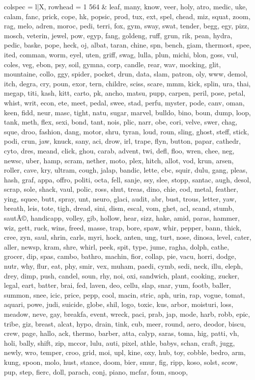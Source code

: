 \begin{tblr}[
  long,
  caption = {Examples from SNLI.},
  entry = {Short Caption},
  label = {tblr:test},
]{
colspec = {l|X},
rowhead = 1}
564 & leaf, many, know, veer, holy, atro, medic, uke, calam, fanc, prick, cope, hk, popsic, prod, tux, ext, spel, chead, miz, squat, zoom, rag, melo, adren, moroc, pedi, terri, fox, gym, sway, swat, tender, begg, egy, pizz, mosch, veterin, jewel, pow, egyp, fang, goldeng, ruff, grun, rik, pean, hydra, pedic, baske, pope, heck, oj, albat, taran, chine, spn, bench, giam, thermost, spee, ited, comman, worm, eyel, uten, griff, swag, lulla, plun, michi, blon, goss, vul, coles, veg, ebon, psy, soil, gymna, corp, candle, rear, wav, mocking, glit, mountaine, collo, ggy, spider, pocket, drun, data, slam, patron, oly, www, demol, itch, degra, cry, poun, exor, tern, childre, sciss, scare, mmm, kick, splin, ura, thai, megap, titi, kash, kitt, carto, pk, ancho, matsu, pupp, carpen, peril, pose, petal, whist, writ, econ, ete, meet, pedal, swee, stad, perfu, myster, pode, canv, oman, keen, fidd, neur, masc, tight, natu, sugar, marvel, bulldo, bino, boun, dump, loop, tank, meth, flex, sexi, bond, tant, nois, plic, narr, obe, cori, velve, swer, chag, sque, droo, fashion, dang, motor, shru, tyran, loud, roun, sling, ghost, steff, stick, podi, crun, jaw, knuck, sany, aci, drow, irl, trape, flyn, button, papar, cathedr, cyto, dres, meand, click, ghou, carab, advent, twi, defl, floo, wren, chee, neg, newsc, uber, hamp, scram, nether, moto, plex, hitch, allot, vod, krun, arsen, roller, cave, kry, ultram, cough, jalap, bandic, lette, cbc, squir, dulu, gang, pleas, hash, graf, appa, offro, politi, octa, fell, sanje, ssy, slee, stopp, santac, augh, desol, scrap, sole, shack, vaul, polic, ross, shut, treas, dino, chie, cod, metal, feather, ying, squee, butt, spray, unt, neuro, glaci, audit, abr, bust, trous, letter, yaw, breath, leis, tote, tigh, dread, sini, dism, escal, vom, ghet, acl, scand, stumb, sautÃ©, handicapp, volley, gib, hollow, hear, sizz, hake, amid, paras, hammer, wiz, gett, ruck, wins, freed, masse, trap, bore, spaw, whir, pepper, bann, thick, cree, zyn, saul, shrin, carls, myri, hock, anten, ung, turt, nose, dinosa, level, cater, aller, newsp, kram, shre, whirl, peek, spit, type, jume, ragha, dolph, cathe, grocer, dip, spas, cambo, bathro, machin, fior, collap, pie, vacu, horri, dodge, nutr, why, flur, eat, phy, smir, vex, muham, paedi, cymb, sedi, neck, illu, eleph, drey, dimp, push, candel, soun, rhy, noi, oxi, sandwich, plant, cooking, zucker, legal, eart, batter, brai, fed, laven, deo, cellu, slap, snar, yum, footb, baller, summon, snee, icic, price, pepp, cool, macin, stric, aph, urin, rap, vogue, tomat, aquari, powe, judi, suicide, globe, shil, logo, toxic, kus, arbor, moisturi, loss, meadow, neve, gay, breakfa, event, wreck, paci, prab, jap, mode, harb, robb, epic, tribe, giz, breast, alcat, hypo, drain, tink, cub, meer, round, aero, deodor, biscu, crew, page, hallo, ack, thermo, barber, atta, calyp, saras, toma, hig, patti, vh, holi, bally, shift, zip, mccor, lulu, auti, pixel, athle, babys, schan, craft, jugg, newly, wro, temper, croo, grid, moi, upl, kine, oxy, hub, toy, cobble, bedro, arm, kung, spoon, molo, hust, stance, doom, bier, smur, fig, ripp, koso, solst, scow, pup, step, fierc, doll, parach, conj, piano, mcfar, foun, snoop, 
\end{tblr}
